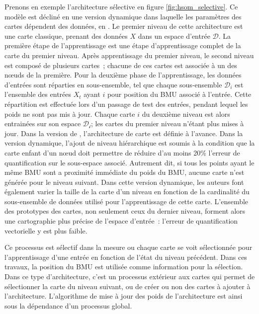 \documentclass[../main]{subfiles}
\begin{document}
Prenons en exemple l'architecture sélective \cite{barbalho_hierarchical_2001} en figure \ref{fig:hsom_selective}. Ce modèle est décliné en une version dynamique dans laquelle les paramètres des cartes dépendent des données, en \cite{Costa2016ANS}.
Le premier niveau de cette architecture est une carte classique, prenant des données $X$ dans un espace d'entrée $\mathcal{D}$.
La première étape de l'apprentissage est une étape d'apprentissage complet de la carte du premier niveau.
Après apprentissage du premier niveau, le second niveau est composé de plusieurs cartes~; chacune de ces cartes est associée à un des n\oe{}uds de la première.
Pour la deuxième phase de l'apprentissage, les données d'entrées sont réparties en sous-ensemble, tel que chaque sous-ensemble $\mathcal{D}_i$ est l'ensemble des entrées $X_t$ ayant $i$ pour position du BMU associé à l'entrée. Cette répartition est effectuée lors d'un passage de test des entrées, pendant lequel les poids ne sont pas mis à jour.
Chaque carte $i$ du deuxième niveau est alors entrainées sur son espace $\mathcal{D_i}$; les cartes du premier niveau n'étant plus mises à jour.
Dans la version de \cite{barbalho_hierarchical_2001}, l'architecture de carte est définie à l'avance. Dans la version dynamique, l'ajout de niveau hiérarchique est soumis à la condition que la carte enfant d'un n\oe{}ud doit permettre de réduire d'au moins 20\% l'erreur de quantification sur le sous-espace associé. Autrement dit, si tous les points ayant le même BMU sont a proximité immédiate du poids du BMU, aucune carte n'est générée pour le niveau suivant. Dans cette version dynamique, les auteurs font également varier la taille de la carte d'un niveau en fonction de la cardinalité du sous-ensemble de données utilisé pour l'apprentissage de cette carte.
L'ensemble des prototypes des cartes, non seulement ceux du dernier niveau, forment alors une cartographie plus précise de l'espace d'entrée~: l'erreur de quantification vectorielle y est plus faible.

Ce processus est sélectif dans la mesure ou chaque carte se voit sélectionnée pour l'apprentissage d'une entrée en fonction de l'état du niveau précédent. Dans ces travaux, la position du BMU est utilisée comme information pour la sélection. 
Dans ce type d'architecture, c'est un processus extérieur aux cartes qui permet de sélectionner la carte du niveau suivant, ou de créer ou non des cartes à ajouter à l'architecture. L'algorithme de mise à jour des poids de l'architecture est ainsi sous la dépendance d'un processus global.
\end{document}

